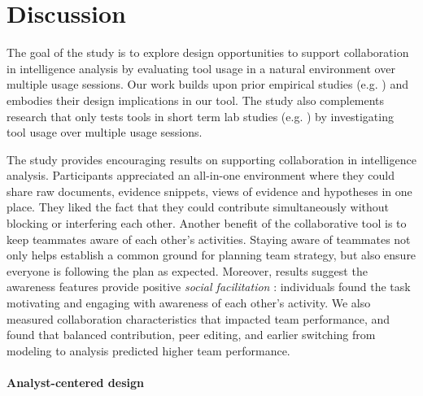 \section{Discussion}\label{discussion}

The goal of the study is to explore design opportunities to support
collaboration in intelligence analysis by evaluating tool usage in a natural
environment over multiple usage sessions. Our work builds upon prior
empirical studies (e.g.
\cite{Carroll2013,Borge2012,Kang2011,Chin2009}) and embodies
their design implications in our tool. The study also complements
research that only tests tools in short term lab studies (e.g.
\cite{Convertino2011,Goyal2016,Hajizadeh2013}) by investigating tool usage over multiple usage sessions.

The study provides encouraging results on supporting collaboration in intelligence analysis.
Participants appreciated an all-in-one environment where they could
share raw documents, evidence snippets, views of evidence and hypotheses
in one place. They liked the fact that they could contribute
simultaneously without blocking or interfering each other. Another
benefit of the collaborative tool is to keep teammates aware of each
other's activities. Staying aware of teammates not only helps establish a common ground for planning team strategy, but also ensure everyone is following the plan as expected. Moreover, results suggest the awareness features provide positive \emph{social facilitation} \cite{Zajonc1965}: individuals found the task motivating and engaging with awareness of each other's activity. We also measured collaboration characteristics that impacted team performance, and found that balanced contribution, peer editing, and earlier switching  from modeling to analysis predicted higher team performance.

\paragraph{Analyst-centered design}

